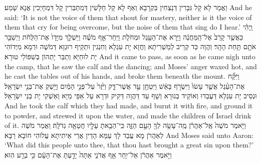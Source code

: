 {וַאֲמַר לָא קָל גִּבָּרִין דְּנָצְחִין בִּקְרָבָא וְאַף לָא קָל חַלָּשִׁין דְּמִתַּבְּרִין קָל דִּמְחָיְכִין אֲנָא שָׁמַע׃}
{And he said: ‘It is not the voice of them that shout for mastery, neither is it the voice of them that cry for being overcome, but the noise of them that sing do I hear.’}{}
{וַֽיְהִ֗י כַּאֲשֶׁ֤ר קָרַב֙ אֶל־הַֽמַּחֲנֶ֔ה וַיַּ֥רְא אֶת־הָעֵ֖גֶל וּמְחֹלֹ֑ת וַיִּֽחַר־אַ֣ף מֹשֶׁ֗ה וַיַּשְׁלֵ֤ךְ מִיָּדָו֙ אֶת־הַלֻּחֹ֔ת וַיְשַׁבֵּ֥ר אֹתָ֖ם תַּ֥חַת הָהָֽר׃
}
{וַהֲוָה כַּד קְרֵיב לְמַשְׁרִיתָא וַחֲזָא יָת עִגְלָא וְחִנְגִין וּתְקֵיף רוּגְזָא דְּמֹשֶׁה וּרְמָא מִיְּדוֹהִי יָת לוּחַיָּא וְתַבַּר יָתְהוֹן בְּשִׁפּוֹלֵי טוּרָא׃}
{And it came to pass, as soon as he came nigh unto the camp, that he saw the calf and the dancing; and Moses’ anger waxed hot, and he cast the tables out of his hands, and broke them beneath the mount.}{}
{וַיִּקַּ֞ח אֶת־הָעֵ֨גֶל אֲשֶׁ֤ר עָשׂוּ֙ וַיִּשְׂרֹ֣ף בָּאֵ֔שׁ וַיִּטְחַ֖ן עַ֣ד אֲשֶׁר־דָּ֑ק וַיִּ֙זֶר֙ עַל־פְּנֵ֣י הַמַּ֔יִם וַיַּ֖שְׁקְ אֶת־בְּנֵ֥י יִשְׂרָאֵֽל׃
}
{וּנְסֵיב יָת עִגְלָא דַּעֲבַדוּ וְאוֹקֵיד בְּנוּרָא וְשָׁף עַד דַּהֲוָה דַּקִיק וּדְרָא עַל אַפֵּי מַיָּא וְאַשְׁקִי יָת בְּנֵי יִשְׂרָאֵל׃}
{And he took the calf which they had made, and burnt it with fire, and ground it to powder, and strewed it upon the water, and made the children of Israel drink of it.}{}
{וַיֹּ֤אמֶר מֹשֶׁה֙ אֶֽל־אַהֲרֹ֔ן מֶֽה־עָשָׂ֥ה לְךָ֖ הָעָ֣ם הַזֶּ֑ה כִּֽי־הֵבֵ֥אתָ עָלָ֖יו חֲטָאָ֥ה גְדֹלָֽה׃
}
{וַאֲמַר מֹשֶׁה לְאַהֲרֹן מָא עֲבַד לָךְ עַמָּא הָדֵין אֲרֵי אֵיתִיתָא עֲלוֹהִי חוֹבָא רַבָּא׃}
{And Moses said unto Aaron: ‘What did this people unto thee, that thou hast brought a great sin upon them?’}{}
{וַיֹּ֣אמֶר אַהֲרֹ֔ן אַל־יִ֥חַר אַ֖ף אֲדֹנִ֑י אַתָּה֙ יָדַ֣עְתָּ אֶת־הָעָ֔ם כִּ֥י בְרָ֖ע הֽוּא׃
}
